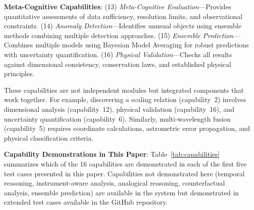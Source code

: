 \documentclass[usenatbib]{rasti}
\begin{document}
\textbf{Meta-Cognitive Capabilities}: (13) \textit{Meta-Cognitive Evaluation}---Provides quantitative assessments of data sufficiency, resolution limits, and observational constraints. (14) \textit{Anomaly Detection}---Identifies unusual objects using ensemble methods combining multiple detection approaches. (15) \textit{Ensemble Prediction}---Combines multiple models using Bayesian Model Averaging for robust predictions with uncertainty quantification. (16) \textit{Physical Validation}---Checks all results against dimensional consistency, conservation laws, and established physical principles.

These capabilities are not independent modules but integrated components that work together. For example, discovering a scaling relation (capability~2) involves dimensional analysis (capability~12), physical validation (capability~16), and uncertainty quantification (capability~6). Similarly, multi-wavelength fusion (capability~5) requires coordinate calculations, astrometric error propagation, and physical classification criteria.

\textbf{Capability Demonstrations in This Paper}: Table~\ref{tab:capabilities} summarizes which of the 16 capabilities are demonstrated in each of the first five test cases presented in this paper. Capabilities not demonstrated here (temporal reasoning, instrument-aware analysis, analogical reasoning, counterfactual analysis, ensemble prediction) are available in the system but demonstrated in extended test cases available in the GitHub repository.
\end{document}
